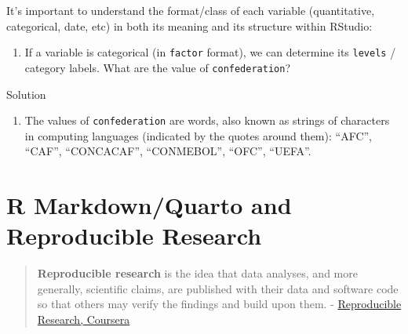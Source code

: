 \documentclass[
  letterpaper,
  DIV=11,
  numbers=noendperiod]{scrreprt}
\newenvironment{Shaded}{\begin{snugshade}}{\end{snugshade}}
\newcommand{\CommentTok}[1]{\textcolor[rgb]{0.37,0.37,0.37}{#1}}
\newcommand{\FunctionTok}[1]{\textcolor[rgb]{0.28,0.35,0.67}{#1}}
\newcommand{\NormalTok}[1]{\textcolor[rgb]{0.00,0.23,0.31}{#1}}
\newcommand{\SpecialCharTok}[1]{\textcolor[rgb]{0.37,0.37,0.37}{#1}}
\providecommand{\tightlist}{%
  \setlength{\itemsep}{0pt}\setlength{\parskip}{0pt}}\usepackage{longtable,booktabs,array}
\begin{document}
It's important to understand the format/class of each variable
(quantitative, categorical, date, etc) in both its meaning and its
structure within RStudio:

\begin{Shaded}
\end{Shaded}

\begin{enumerate}
\def\labelenumi{\alph{enumi}.}
\setcounter{enumi}{1}
\tightlist
\item
  If a variable is categorical (in \texttt{factor} format), we can
  determine its \texttt{levels} / category labels. What are the value of
  \texttt{confederation}?
\end{enumerate}

\begin{Shaded}
\end{Shaded}

Solution

\begin{enumerate}
\def\labelenumi{\alph{enumi}.}
\setcounter{enumi}{1}
\tightlist
\item
  The values of \texttt{confederation} are words, also known as strings
  of characters in computing languages (indicated by the quotes around
  them): ``AFC'', ``CAF'', ``CONCACAF'', ``CONMEBOL'', ``OFC'',
  ``UEFA''.
\end{enumerate}

\section{R Markdown/Quarto and Reproducible
Research}\label{r-markdownquarto-and-reproducible-research}

\begin{quote}
\textbf{Reproducible research} is the idea that data analyses, and more
generally, scientific claims, are published with their data and software
code so that others may verify the findings and build upon them. -
\href{https://www.coursera.org/learn/reproducible-research}{Reproducible
Research, Coursera}
\end{quote}
\end{document}
